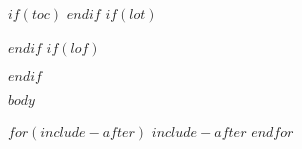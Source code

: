 \documentclass[$if(draft)$$draft$,$endif$$if(fontsize)$$fontsize$,$endif$$if(lang)$$babel-lang$,$endif$$if(papersize)$$papersize$,$endif$$if(sides)$$sides$,$endif$$for(classoption)$$classoption$$sep$,$endfor$]{$documentclass$}
\newcounter{savepage}
\begin{document}
$if(toc)$
\clearpage
{}
{\hypersetup{linkcolor=$if(toccolor)$$toccolor$$else$black$endif$}
\setcounter{tocdepth}{$toc-depth$}
\renewcommand{\contentsname}{Table of Contents}
\singlespacing
\tableofcontents}
$endif$
$if(lot)$
\newpage{}
{}
\label{chap:list-of-tables}
\listoftables
$endif$
$if(lof)$
\newpage{}
{}
\label{chap:list-of-figures}
\listoffigures
$endif$

\setcounter{savepage}{\number\value{page}}

\mainmatter

$body$

$for(include-after)$
$include-after$
$endfor$
\end{document}
